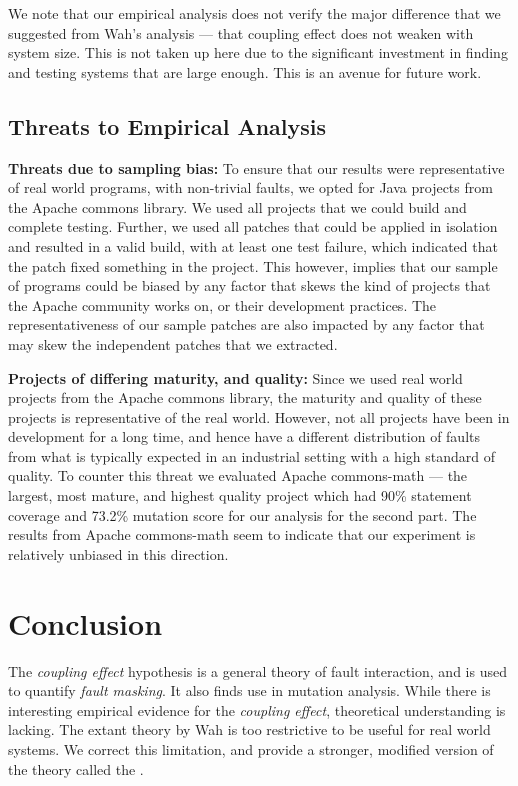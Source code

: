 \documentclass[preprint,nonatbib]{sigplanconf}\usepackage[]{graphicx}\usepackage[]{color}
\begin{document}
We note that our empirical analysis does not verify the major difference
that we suggested from Wah's analysis --- that coupling effect does not weaken
with system size. This is not taken up here due to the significant investment
in finding and testing systems that are large enough. This is an avenue for
future work.

\subsection{Threats to Empirical Analysis}

\noindent\textbf{Threats due to sampling bias:} To ensure that our results were
representative of real world programs, with non-trivial faults, we opted for
Java projects from the Apache commons library. We used all projects
that we could build and complete testing. Further, we used all patches that
could be applied in isolation and resulted in a valid build, with at least
one test failure, which indicated that the patch fixed something in the
project. This however, implies that our sample of programs could be biased by
any factor that skews the kind of projects that the Apache community works on,
or their development practices. The representativeness of our sample patches
are also impacted by any factor that may skew the independent patches that
we extracted.

\noindent\textbf{Projects of differing maturity, and quality:} Since we used
real world projects from the Apache commons library, the maturity and quality
of these projects is representative of the real world.
However, not all projects have been in development for a long time, and hence
have a different distribution of faults from what is typically expected in an
industrial setting with a high standard of quality. To counter this threat
we evaluated Apache commons-math --- the largest, most mature, and highest
quality project which had 90\% statement coverage and 73.2\% mutation score for
our analysis for the second part. The results from Apache commons-math seem to
indicate that our experiment is relatively unbiased in this direction.



\section{Conclusion}
\label{sec:conclusion}

The \emph{coupling effect} hypothesis is a general theory of fault interaction,
and is used to quantify \emph{fault masking}. It also finds use in mutation
analysis. While there is interesting empirical evidence for the
\emph{coupling effect}, theoretical understanding is lacking. The extant theory
by Wah is too restrictive to be useful for real world systems.
We correct this limitation, and provide a stronger, modified version of
the theory called the \efaultT.
\end{document}

